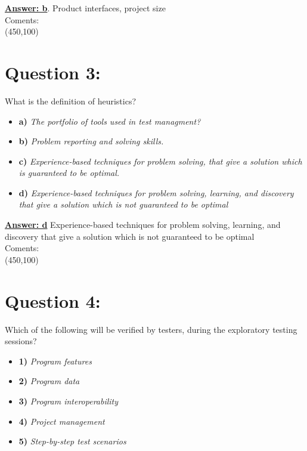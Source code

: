 \documentclass[12pt,a4paper,norsk]{article}
\begin{document}
\underline{\textbf{Answer: b}}. Product interfaces, project size\\

\noindent Coments:\\
\framebox(450,100){}\\

\section {Question 3:} What is the definition of heuristics?\\

\begin{itemize}
 \item \textbf{a)} \textit{The portfolio of tools used in test managment?}
 \item \textbf{b)} \textit{Problem reporting and solving skills.}
 \item \textbf{c)} \textit{Experience-based techniques for problem solving, that give a solution which is guaranteed to be optimal.}
 \item \textbf{d)} \textit{Experience-based techniques for problem solving, learning, and discovery that give a solution which is not guaranteed to be optimal}
\end{itemize}

\underline{\textbf{Answer: d}} Experience-based techniques for problem solving, learning, and discovery that give a solution which is not guaranteed to be optimal \\

\noindent Coments:\\
\framebox(450,100){}\\

\section {Question 4:} Which of the following will be verified by testers, during the exploratory testing sessions?\\

\begin{itemize}
 \item \textbf{1)} \textit{Program features}
 \item \textbf{2)} \textit{Program data}
 \item \textbf{3)} \textit{Program interoperability}
 \item \textbf{4)} \textit{Project management}
 \item \textbf{5)} \textit{Step-by-step test scenarios}

\end{itemize}
\end{document}
